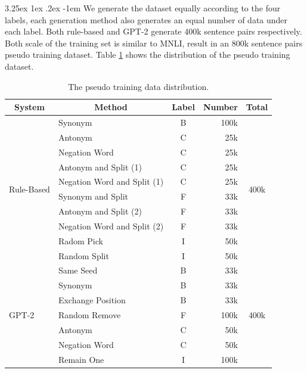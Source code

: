 \documentclass[12pt]{article}
\makeatletter
\renewcommand\paragraph{\@startsection{paragraph}{5}{\z@}%
  {3.25ex \@plus1ex \@minus.2ex}%
  {-1em}%
  {\normalfont\normalsize\bfseries}}
\makeatother
\begin{document}
\begin{CJK*}{UTF8}{bkai}
\begin{spacing}{1.77}
\paragraph{}
We generate the dataset equally according to the four labels, each generation method also generates an equal number of data under each label. Both rule-based and GPT-2 generate 400k sentence pairs respectively. Both scale of the training set is similar to MNLI, result in an 800k sentence pairs pseudo training dataset. Table \ref{table:pseudo_training_data_dist} shows the distribution of the pseudo training dataset.

\begin{table}[H]
  \centering
  \setlength{\extrarowheight}{-3pt}
  \begin{tabular}{|l|l|c|r|c|}
  \hline
  \multicolumn{1}{|c|}{System} & \multicolumn{1}{c|}{Method} & Label & \multicolumn{1}{c|}{Number} & Total \\ \hline
  \multirow{10}{*}{Rule-Based} & Synonym & B & 100k & \multirow{10}{*}{400k} \\ \cline{2-4}
   & Antonym & C & 25k &  \\ \cline{2-4}
   & Negation Word & C & 25k &  \\ \cline{2-4}
   & Antonym and Split (1) & C & 25k &  \\ \cline{2-4}
   & Negation Word and Split (1) & C & 25k &  \\ \cline{2-4}
   & Synonym and Split & F & 33k &  \\ \cline{2-4}
   & Antonym and Split (2) & F & 33k &  \\ \cline{2-4}
   & Negation Word and Split (2) & F & 33k &  \\ \cline{2-4}
   & Radom Pick & I & 50k &  \\ \cline{2-4}
   & Random Split & I & 50k &  \\ \hline
  \multirow{7}{*}{GPT-2} & Same Seed & B & 33k & \multirow{7}{*}{400k} \\ \cline{2-4}
   & Synonym & B & 33k &  \\ \cline{2-4}
   & Exchange Position & B & 33k &  \\ \cline{2-4}
   & Random Remove & F & 100k &  \\ \cline{2-4}
   & Antonym & C & 50k &  \\ \cline{2-4}
   & Negation Word & C & 50k &  \\ \cline{2-4}
   & Remain One & I & 100k &  \\ \hline
  \end{tabular}
  \caption{The pseudo training data distribution.}
  \label{table:pseudo_training_data_dist}
\end{table}


\end{spacing}
\end{CJK*}
\end{document}
